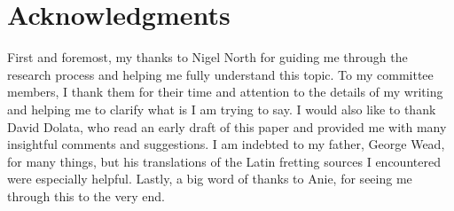 \chapter*{Acknowledgments}

First and foremost, my thanks to Nigel North for guiding me through the research process and helping me fully understand
this topic. To my committee members, I thank them for their time and attention to the details of my writing and helping
me to clarify what is I am trying to say. I would also like to thank David Dolata, who read an early draft of this paper
and provided me with many insightful comments and suggestions. I am indebted to my father, George Wead, for many things,
but his translations of the Latin fretting sources I encountered were especially helpful.  Lastly, a big word of thanks
to Anie, for seeing me through this to the very end.

\clearpage
